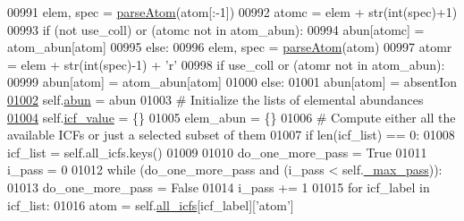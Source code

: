 \begin{DoxyCode}
{{{00991 \textcolor{stringliteral}{                    elem, spec = \hyperlink{namespacepyneb_1_1utils_1_1misc_a8c069186002a3e73dd474958e35034d5}{parseAtom}(atom[:-1])}
00992 \textcolor{stringliteral}{                    atomc = elem + str(int(spec)+1)}
00993 \textcolor{stringliteral}{                    }\textcolor{keywordflow}{if} (\textcolor{keywordflow}{not} use\_coll) \textcolor{keywordflow}{or} (atomc \textcolor{keywordflow}{not} \textcolor{keywordflow}{in} atom\_abun):
00994                         abun[atomc] = atom\_abun[atom]
00995                 \textcolor{keywordflow}{else}:
00996                     elem, spec = \hyperlink{namespacepyneb_1_1utils_1_1misc_a8c069186002a3e73dd474958e35034d5}{parseAtom}(atom)
00997                     atomr = elem + str(int(spec)-1) + \textcolor{stringliteral}{'}\textcolor{stringliteral}{r'}
00998 \textcolor{stringliteral}{                    }\textcolor{keywordflow}{if} use\_coll \textcolor{keywordflow}{or} (atomr \textcolor{keywordflow}{not} \textcolor{keywordflow}{in} atom\_abun):
00999                         abun[atom] = atom\_abun[atom]
01000             \textcolor{keywordflow}{else}:
01001                 abun[atom] = absentIon
\hypertarget{icf_8py_source_l01002}{}\hyperlink{classpyneb_1_1core_1_1icf_1_1_i_c_f_a16f31533c8f77e2b08988b22df5317b1}{01002}         self.\hyperlink{classpyneb_1_1core_1_1icf_1_1_i_c_f_a16f31533c8f77e2b08988b22df5317b1}{abun} = abun
01003         \textcolor{comment}{# Initialize the lists of elemental abundances}
\hypertarget{icf_8py_source_l01004}{}\hyperlink{classpyneb_1_1core_1_1icf_1_1_i_c_f_a9dedc0eb2ad90ea08b8be9984e2d832b}{01004}         self.\hyperlink{classpyneb_1_1core_1_1icf_1_1_i_c_f_a9dedc0eb2ad90ea08b8be9984e2d832b}{icf\_value} = \{\}
01005         elem\_abun = \{\}
01006         \textcolor{comment}{# Compute either all the available ICFs or just a selected subset of them}
01007         \textcolor{keywordflow}{if} len(icf\_list) == 0:
01008             icf\_list = self.all\_icfs.keys()
01009 
01010         do\_one\_more\_pass = \textcolor{keyword}{True}
01011         i\_pass = 0
01012         \textcolor{keywordflow}{while} (do\_one\_more\_pass \textcolor{keywordflow}{and} (i\_pass < self.\hyperlink{classpyneb_1_1core_1_1icf_1_1_i_c_f_a994574a4b1fff9d0700fb483dabc8238}{\_max\_pass})):
01013             do\_one\_more\_pass = \textcolor{keyword}{False}
01014             i\_pass += 1
01015             \textcolor{keywordflow}{for} icf\_label \textcolor{keywordflow}{in} icf\_list:
01016                 atom = self.\hyperlink{classpyneb_1_1core_1_1icf_1_1_i_c_f_a854ee87a53feb102e429e902227ce88b}{all\_icfs}[icf\_label][\textcolor{stringliteral}{'atom'}]
}}}
\end{DoxyCode}

